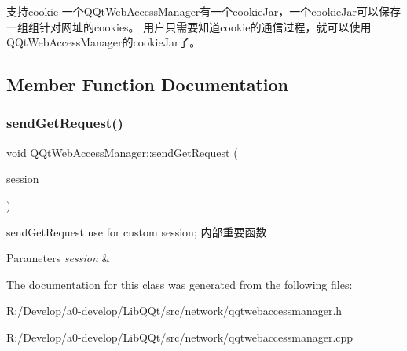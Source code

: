 支持cookie 一个\+Q\+Qt\+Web\+Access\+Manager有一个cookie\+Jar，一个cookie\+Jar可以保存一组组针对网址的cookies。 用户只需要知道cookie的通信过程，就可以使用\+Q\+Qt\+Web\+Access\+Manager的cookie\+Jar了。 

\subsection{Member Function Documentation}
\mbox{\label{class_q_qt_web_access_manager_a8f547f06beac2617150ee9efddd9b477}} 
\subsubsection{\texorpdfstring{send\+Get\+Request()}{sendGetRequest()}}
{\footnotesize\ttfamily void Q\+Qt\+Web\+Access\+Manager\+::send\+Get\+Request (\begin{DoxyParamCaption}\item[{\mbox{\hyperlink{class_q_qt_web_access_session}{Q\+Qt\+Web\+Access\+Session}} $\ast$}]{session }\end{DoxyParamCaption})}



send\+Get\+Request use for custom session; 内部重要函数 


\begin{DoxyParams}{Parameters}
{\em session} & \\
\hline
\end{DoxyParams}


The documentation for this class was generated from the following files\+:\begin{DoxyCompactItemize}
\item 
R\+:/\+Develop/a0-\/develop/\+Lib\+Q\+Qt/src/network/qqtwebaccessmanager.\+h\item 
R\+:/\+Develop/a0-\/develop/\+Lib\+Q\+Qt/src/network/qqtwebaccessmanager.\+cpp\end{DoxyCompactItemize}
